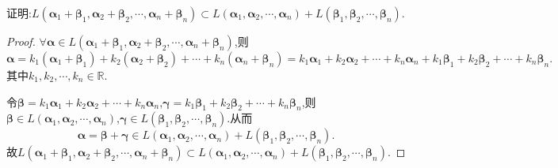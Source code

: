 \documentclass[../../main.tex]{subfiles}%
\begin{document}
\begin{proposition}\label{proposition:和空间包含于空间的和}
证明:$L\left( \boldsymbol{\alpha }_1+\boldsymbol{\beta }_1,\boldsymbol{\alpha }_2+\boldsymbol{\beta }_2,\cdots ,\boldsymbol{\alpha }_n+\boldsymbol{\beta }_n \right) \subset L\left( \boldsymbol{\alpha }_1,\boldsymbol{\alpha }_2,\cdots ,\boldsymbol{\alpha }_n \right) +L\left( \boldsymbol{\beta }_1,\boldsymbol{\beta }_2,\cdots ,\boldsymbol{\beta }_n \right)$.
\end{proposition}
\begin{proof}

$\forall \boldsymbol{\alpha }\in L(\boldsymbol{\alpha }_1+\boldsymbol{\beta }_1,\boldsymbol{\alpha }_2+\boldsymbol{\beta }_2,\cdots,\boldsymbol{\alpha }_n+\boldsymbol{\beta }_n)$,则
\[
\boldsymbol{\alpha } = k_1(\boldsymbol{\alpha }_1+\boldsymbol{\beta }_1)+k_2(\boldsymbol{\alpha }_2+\boldsymbol{\beta }_2)+\cdots +k_n(\boldsymbol{\alpha }_n+\boldsymbol{\beta }_n) = k_1\boldsymbol{\alpha }_1 + k_2\boldsymbol{\alpha }_2+\cdots +k_n\boldsymbol{\alpha }_n + k_1\boldsymbol{\beta }_1 + k_2\boldsymbol{\beta }_2+\cdots +k_n\boldsymbol{\beta }_n.
\]
其中$k_1,k_2,\cdots,k_n\in \mathbb{R}$.

令$\boldsymbol{\beta } = k_1\boldsymbol{\alpha }_1 + k_2\boldsymbol{\alpha }_2+\cdots +k_n\boldsymbol{\alpha }_n$,$\boldsymbol{\gamma } = k_1\boldsymbol{\beta }_1 + k_2\boldsymbol{\beta }_2+\cdots +k_n\boldsymbol{\beta }_n$,则$\boldsymbol{\beta }\in L(\boldsymbol{\alpha }_1,\boldsymbol{\alpha }_2,\cdots,\boldsymbol{\alpha }_n)$,$\boldsymbol{\gamma }\in L(\boldsymbol{\beta }_1,\boldsymbol{\beta }_2,\cdots,\boldsymbol{\beta }_n)$.从而
\[
\boldsymbol{\alpha }=\boldsymbol{\beta }+\boldsymbol{\gamma }\in L(\boldsymbol{\alpha }_1,\boldsymbol{\alpha }_2,\cdots,\boldsymbol{\alpha }_n)+L(\boldsymbol{\beta }_1,\boldsymbol{\beta }_2,\cdots,\boldsymbol{\beta }_n).
\]
故$L\left( \boldsymbol{\alpha }_1+\boldsymbol{\beta }_1,\boldsymbol{\alpha }_2+\boldsymbol{\beta }_2,\cdots ,\boldsymbol{\alpha }_n+\boldsymbol{\beta }_n \right) \subset L\left( \boldsymbol{\alpha }_1,\boldsymbol{\alpha }_2,\cdots ,\boldsymbol{\alpha }_n \right) +L\left( \boldsymbol{\beta }_1,\boldsymbol{\beta }_2,\cdots ,\boldsymbol{\beta }_n \right)$.

\end{proof}
\end{document}
